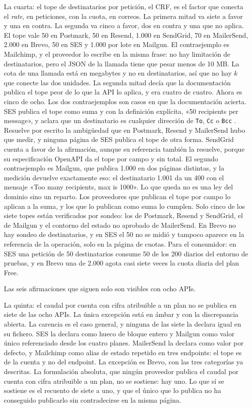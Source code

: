 La cuarta: el tope de destinatarios por petición, el CRF, es el factor que conecta el \textit{rate}, en peticiones, con la cuota, en correos.
La primera mitad va siete a favor y una en contra.
La segunda va cinco a favor, dos en contra y una que no aplica.
El tope vale 50 en Postmark, 50 en Resend, 1.000 en SendGrid, 70 en MailerSend, 2.000 en Brevo, 50 en SES y 1.000 por lote en Mailgun.
El contraejemplo es Mailchimp, y el proveedor lo escribe en la misma frase: no hay limitación de destinatarios, pero el JSON de la llamada tiene que pesar menos de 10 MB.
La cota de una llamada está en megabytes y no en destinatarios, así que no hay $k$ que conecte las dos unidades.
La segunda mitad decía que la documentación publica el tope peor de lo que la API lo aplica, y era cuatro de cuatro. Ahora es cinco de ocho.
Los dos contraejemplos son casos en que la documentación acierta.
SES publica el tope como suma y con la definición explícita, «50 recipients per message», y aclara que un destinatario es cualquier dirección de \texttt{To}, \texttt{Cc} o \texttt{Bcc} \citep{sesdocs}.
Resuelve por escrito la ambigüedad que en Postmark, Resend y MailerSend hubo que medir, y ninguna página de SES publica el tope de otra forma.
SendGrid cuenta a favor de la afirmación, aunque su referencia también la resuelve, porque su especificación OpenAPI da el tope por campo y sin total.
El segundo contraejemplo es Mailgun, que publica 1.000 en dos páginas distintas, y la medición devuelve exactamente eso: el destinatario 1.001 da un 400 con el mensaje «Too many recipients, max is 1000».
Lo que queda no es una ley del dominio sino un reparto. Los proveedores que publican el tope por campo lo aplican a la suma, y los que lo publican como suma lo cumplen.
Solo cinco de los siete topes están verificados por sondeo: los de Postmark, Resend y SendGrid, el de Mailgun y el contorno del estado no aprobado de MailerSend.
En Brevo no hay sondeo de destinatarios, y en SES el 50 no se midió y tampoco aparece en la referencia de la operación, solo en la página de cuotas.
Para el consumidor: en SES una petición de 50 destinatarios consume 50 de los 200 diarios del entorno de pruebas, y en Brevo una de 2.000 agota casi siete veces la cuota diaria del plan Free.

Las seis afirmaciones que siguen solo son visibles con ocho APIs.

La quinta: el caudal por cuenta con cifra atribuible a un plan no se publica en siete de las ocho APIs.
La única excepción está en ámbar y con la discrepancia abierta.
La carencia es el caso general, y ninguna de las siete la declara igual en su fichero.
SES la declara como hueco de bloque entero y Mailgun como valor único referenciado desde los cuatro planes.
MailerSend la declara como valor por defecto, y Mailchimp como alias de estado repetido en tres endpoints: el tope es de la cuenta y no del endpoint.
La excepción es Brevo, con las tres categorías ya descritas.
La formulación absoluta, que ningún proveedor publica el caudal por cuenta con cifra atribuible a un plan, no se sostiene: hay uno.
Lo que sí se sostiene es el recuento de siete a uno, y que el único que lo publica no ha conseguido publicarlo sin contradecirse en la misma página.

